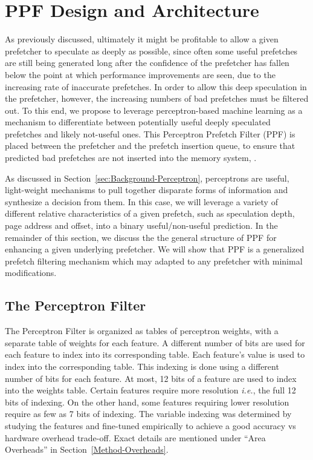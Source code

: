\section{PPF Design and Architecture}
\label{Arch}

As previously discussed, ultimately it might be profitable to allow a
given prefetcher to speculate as deeply as possible, since often some
useful prefetches are still being generated long after the confidence
of the prefetcher has fallen below the point at which performance
improvements are seen, due to the increasing rate of inaccurate
prefetches.  In order to allow this deep speculation in the
prefetcher, however, the increasing numbers of bad prefetches must be
filtered out.  To this end, we propose to leverage perceptron-based
machine learning as a mechanism to differentiate between potentially
useful deeply speculated prefetches and likely not-useful ones.  This
Perceptron Prefetch Filter (PPF) is placed between the prefetcher and
the prefetch insertion queue, to ensure that predicted bad prefetches
are not inserted into the memory system, .

As discussed in Section~\ref{sec:Background-Perceptron}, perceptrons
are useful, light-weight mechanisms to pull together disparate forms
of information and synthesize a decision from them.  In this case, we
will leverage a variety of different relative characteristics of a
given prefetch, such as speculation depth, page address and offset,
into a binary useful/non-useful prediction.  In the remainder of this
section, we discuss the the general structure of PPF for enhancing a
given underlying prefetcher.  We will show that PPF is a generalized
prefetch filtering mechanism which may adapted to any prefetcher with
minimal modifications. %

\subsection{The Perceptron Filter}
\label{Arch-Perceptron}


The Perceptron Filter is organized as tables of perceptron weights,
with a separate table of weights for each feature.  A different number
of bits are used for each feature to index into its corresponding
table.
Each feature's value is used to index into the corresponding table.
This indexing is done using a different number of bits for each
feature.  At most, 12 bits of a feature are used to index into the
weights table. Certain features require more resolution \textit{i.e.},
the full 12 bits of indexing.  On the other hand, some features
requiring lower resolution require as few as 7 bits of indexing.  The
variable indexing was determined by studying the features and
fine-tuned empirically to achieve a good accuracy vs hardware overhead
trade-off.  Exact details are mentioned under ``Area Overheads'' in
Section~\ref{Method-Overheads}. 

